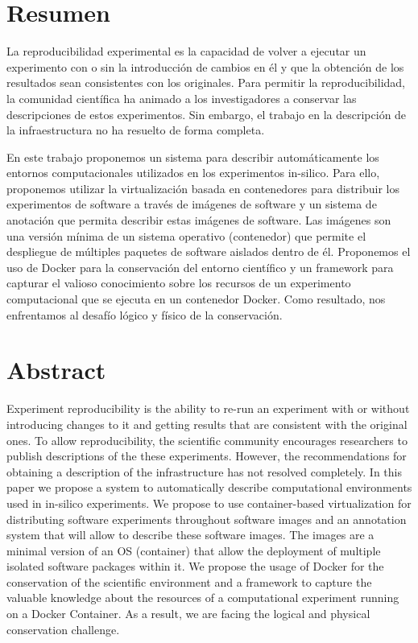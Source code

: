 

\section*{Resumen}

La reproducibilidad experimental es la capacidad de volver a ejecutar un experimento con o sin la introducción de cambios en él y que la obtención de los resultados sean consistentes con los originales. 
Para permitir la reproducibilidad, la comunidad científica ha animado a los investigadores a conservar las descripciones de estos experimentos. 
Sin embargo, el trabajo en la descripción de la infraestructura no ha resuelto de forma completa.

En este trabajo proponemos un sistema para describir automáticamente los entornos computacionales utilizados en los experimentos in-silico. 
Para ello, proponemos utilizar la virtualización basada en contenedores para distribuir los experimentos de software a través de imágenes de software y un sistema de anotación que permita describir estas imágenes de software. 
Las imágenes son una versión mínima de un sistema operativo (contenedor) que permite el despliegue de múltiples paquetes de software aislados dentro de él. 
Proponemos el uso de Docker para la conservación del entorno científico y un framework para capturar el valioso conocimiento sobre los recursos de un experimento computacional que se ejecuta en un contenedor Docker.
 Como resultado, nos enfrentamos al desafío lógico y físico de la conservación. 
 \newpage
\section*{Abstract}
% 
Experiment reproducibility is the ability to re-run an experiment with or without introducing changes to it and getting results that are consistent with the original ones. 
To allow reproducibility, the scientific community encourages researchers to publish descriptions of the these experiments. 
However, the recommendations for obtaining a description of the infrastructure has not resolved completely.
In this paper we propose a system to automatically describe computational environments used in in-silico experiments. We propose to use container-based virtualization for distributing software experiments throughout software images and an annotation system that will allow to describe these software images. The images are a minimal version of an OS (container) that allow the deployment of multiple isolated software packages within it. 
We propose the usage of Docker for the conservation of the scientific environment and a framework to capture the valuable knowledge about the resources of a computational experiment running on a Docker Container. As a result, we are facing the logical and physical conservation challenge. 